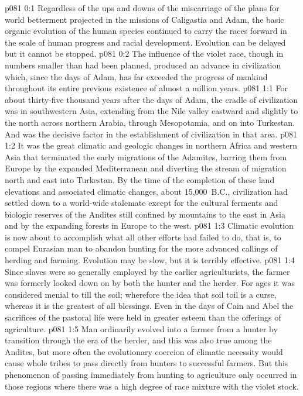 \author{Archangel}
\vs p081 0:1 Regardless of the ups and downs of the miscarriage of the plans for world betterment projected in the missions of Caligastia and Adam, the basic organic evolution of the human species continued to carry the races forward in the scale of human progress and racial development. Evolution can be delayed but it cannot be stopped.
\vs p081 0:2 The influence of the violet race, though in numbers smaller than had been planned, produced an advance in civilization which, since the days of Adam, has far exceeded the progress of mankind throughout its entire previous existence of almost a million years.
\vs p081 1:1 For about thirty\hyp{}five thousand years after the days of Adam, the cradle of civilization was in southwestern Asia, extending from the Nile valley eastward and slightly to the north across northern Arabia, through Mesopotamia, and on into Turkestan. And  was the decisive factor in the establishment of civilization in that area.
\vs p081 1:2 It was the great climatic and geologic changes in northern Africa and western Asia that terminated the early migrations of the Adamites, barring them from Europe by the expanded Mediterranean and diverting the stream of migration north and east into Turkestan. By the time of the completion of these land elevations and associated climatic changes, about 15,000~B.C., civilization had settled down to a world\hyp{}wide stalemate except for the cultural ferments and biologic reserves of the Andites still confined by mountains to the east in Asia and by the expanding forests in Europe to the west.
\vs p081 1:3 Climatic evolution is now about to accomplish what all other efforts had failed to do, that is, to compel Eurasian man to abandon hunting for the more advanced callings of herding and farming. Evolution may be slow, but it is terribly effective.
\vs p081 1:4 Since slaves were so generally employed by the earlier agriculturists, the farmer was formerly looked down on by both the hunter and the herder. For ages it was considered menial to till the soil; wherefore the idea that soil toil is a curse, whereas it is the greatest of all blessings. Even in the days of Cain and Abel the sacrifices of the pastoral life were held in greater esteem than the offerings of agriculture.
\vs p081 1:5 Man ordinarily evolved into a farmer from a hunter by transition through the era of the herder, and this was also true among the Andites, but more often the evolutionary coercion of climatic necessity would cause whole tribes to pass directly from hunters to successful farmers. But this phenomenon of passing immediately from hunting to agriculture only occurred in those regions where there was a high degree of race mixture with the violet stock.
